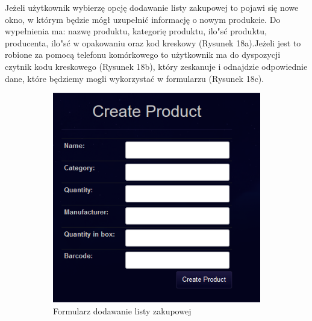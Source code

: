 \documentclass{article}
\begin{document}
Jeżeli użytkownik wybierzę opcję dodawanie listy zakupowej to pojawi się nowe okno, w którym będzie mógł uzupełnić informację o nowym produkcie. Do wypełnienia ma: nazwę produktu, kategorię produktu, ilo"sć produktu, producenta, ilo"sć w opakowaniu oraz kod kreskowy (Rysunek 18a).Jeżeli jest to robione za pomocą telefonu komórkowego to użytkownik ma do dyspozycji czytnik kodu kreskowego (Rysunek 18b), który zeskanuje i odnajdzie odpowiednie dane, które będziemy mogli wykorzystać w formularzu (Rysunek 18c).
\begin{figure}[!ht]
  \centering
\begin{subfigure}{.3\textwidth}
  \centering
   \includegraphics[width=1\textwidth]{reshp9}\par\vspace{1cm}
  \caption{Formularz dodawanie listy zakupowej}
  \label{fig:sub1}
\end{subfigure}%
\begin{subfigure}{.3\textwidth}
  \centering

\end{subfigure}
\end{figure}
\end{document}
